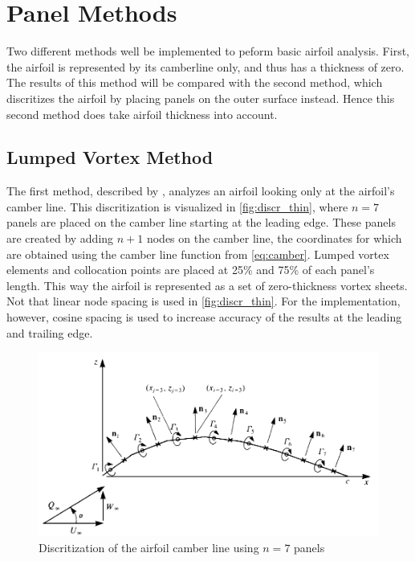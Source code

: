 \chapter{Panel Methods}  %
Two different methods well be implemented to peform basic airfoil analysis.
First, the airfoil is represented by its camberline only, and thus has a
thickness of zero. The results of this method will be compared with the second
method, which discritizes the airfoil by placing panels on the outer surface
instead. Hence this second method does take airfoil thickness into account.

\section{Lumped Vortex Method}
\label{sec:thin}
The first method, described by \citeauthor{katz_plotkin}\cite{katz_plotkin}, analyzes an airfoil
looking only at the airfoil's camber line. This discritization is visualized in
\autoref{fig:discr_thin}, where $n=7$ panels are placed on the camber line starting at
the leading edge. These panels are created by adding $n+1$ nodes on the camber
line, the coordinates for which are obtained using the camber line function from
\autoref{eq:camber}. Lumped vortex elements and collocation points are placed at
25\% and 75\% of each panel's length. This way the airfoil is represented as a
set of zero-thickness vortex sheets. Not that linear node spacing is used in
\autoref{fig:discr_thin}. For the implementation, however, cosine spacing is used to
increase accuracy of the results at the leading and trailing edge.


\begin{figure}[H]
\centering
\includegraphics[width=.8\textwidth]{static/disc_camber.png}
\caption{Discritization of the airfoil camber line using $n=7$ panels \cite{katz_plotkin}}
\label{fig:discr_thin}
\end{figure}

